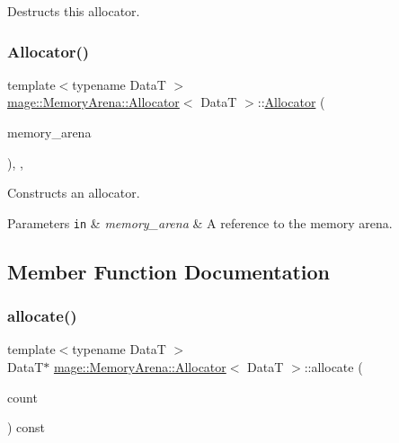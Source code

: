 Destructs this allocator. \hypertarget{classmage_1_1_memory_arena_1_1_allocator_a0e4b65dba593a1fc8b77e7f2c4ad9659}{}\label{classmage_1_1_memory_arena_1_1_allocator_a0e4b65dba593a1fc8b77e7f2c4ad9659} 
\subsubsection{\texorpdfstring{Allocator()}{Allocator()}\hspace{0.1cm}{\footnotesize\ttfamily [4/4]}}
{\footnotesize\ttfamily template$<$typename DataT $>$ \\
\hyperlink{classmage_1_1_memory_arena_1_1_allocator}{mage\+::\+Memory\+Arena\+::\+Allocator}$<$ DataT $>$\+::\hyperlink{classmage_1_1_memory_arena_1_1_allocator}{Allocator} (\begin{DoxyParamCaption}\item[{\hyperlink{namespacemage_a8769f9d670d6b585ea306cb1062af94b}{Not\+Null}$<$ \hyperlink{classmage_1_1_memory_arena}{Memory\+Arena} $\ast$ $>$}]{memory\+\_\+arena }\end{DoxyParamCaption})\hspace{0.3cm}{\ttfamily [explicit]}, {\ttfamily [private]}, {\ttfamily [noexcept]}}

Constructs an allocator.


\begin{DoxyParams}[1]{Parameters}
\mbox{\tt in}  & {\em memory\+\_\+arena} & A reference to the memory arena. \\
\hline
\end{DoxyParams}


\subsection{Member Function Documentation}
\hypertarget{classmage_1_1_memory_arena_1_1_allocator_a46d428590d87f47742abc173858ccc95}{}\label{classmage_1_1_memory_arena_1_1_allocator_a46d428590d87f47742abc173858ccc95} 
\subsubsection{\texorpdfstring{allocate()}{allocate()}\hspace{0.1cm}{\footnotesize\ttfamily [1/2]}}
{\footnotesize\ttfamily template$<$typename DataT $>$ \\
DataT$\ast$ \hyperlink{classmage_1_1_memory_arena_1_1_allocator}{mage\+::\+Memory\+Arena\+::\+Allocator}$<$ DataT $>$\+::allocate (\begin{DoxyParamCaption}\item[{size\+\_\+t}]{count }\end{DoxyParamCaption}) const}

